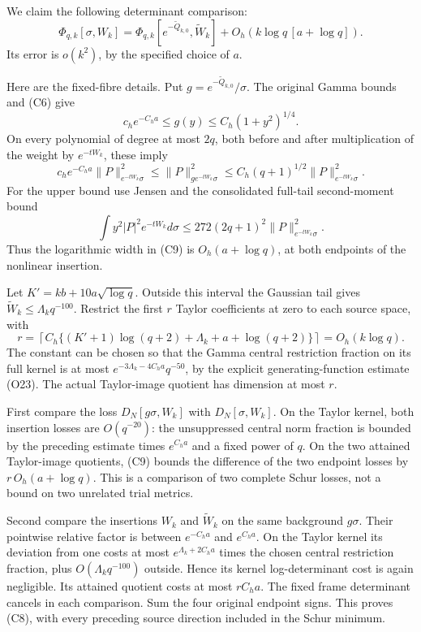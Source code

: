 \documentclass[
  11pt,
]{article}
\begin{document}
We claim the following determinant comparison: \[
\boxed{\Phi_{q,k}[\sigma,W_k]
=\Phi_{q,k}[e^{-\widetilde Q_{k,0}},\widetilde W_k]
+O_h\!\left(k\log q\,[a+\log q]\right).}\tag{C8}
\] Its error is \(o(k^2)\), by the specified choice of \(a\).

Here are the fixed-fibre details. Put
\(g=e^{-\widetilde Q_{k,0}}/\sigma\). The original Gamma bounds and (C6)
give \[
c_he^{-C_ha}\le g(y)\le C_h(1+y^2)^{1/4}.
\] On every polynomial of degree at most \(2q\), both before and after
multiplication of the weight by \(e^{-tW_k}\), these imply \[
c_he^{-C_ha}\|P\|_{e^{-tW_k}\sigma}^2
\le\|P\|_{g e^{-tW_k}\sigma}^2
\le C_h(q+1)^{1/2}\|P\|_{e^{-tW_k}\sigma}^2.
\tag{C9}
\] For the upper bound use Jensen and the consolidated full-tail
second-moment bound \[
\int y^2|P|^2e^{-tW_k}d\sigma\le272(2q+1)^2\|P\|_{e^{-tW_k}\sigma}^2.
\] Thus the logarithmic width in (C9) is \(O_h(a+\log q)\), at both
endpoints of the nonlinear insertion.

Let \(K'=kb+10a\sqrt{\log q}\). Outside this interval the Gaussian tail
gives \(\widetilde W_k\le\Lambda_k q^{-100}\). Restrict the first \(r\)
Taylor coefficients at zero to each source space, with \[
r=\left\lceil C_h\{(K'+1)\log(q+2)+\Lambda_k+a+\log(q+2)\}\right\rceil
=O_h(k\log q).
\tag{C10}
\] The constant can be chosen so that the Gamma central restriction
fraction on its full kernel is at most \(e^{-3\Lambda_k-4C_ha}q^{-50}\),
by the explicit generating-function estimate (O23). The actual
Taylor-image quotient has dimension at most \(r\).

First compare the loss \(D_N[g\sigma,W_k]\) with \(D_N[\sigma,W_k]\). On
the Taylor kernel, both insertion losses are \(O(q^{-20})\): the
unsuppressed central norm fraction is bounded by the preceding estimate
times \(e^{C_ha}\) and a fixed power of \(q\). On the two attained
Taylor-image quotients, (C9) bounds the difference of the two endpoint
losses by \(r\,O_h(a+\log q)\). This is a comparison of two complete
Schur losses, not a bound on two unrelated trial metrics.

Second compare the insertions \(W_k\) and \(\widetilde W_k\) on the same
background \(g\sigma\). Their pointwise relative factor is between
\(e^{-C_ha}\) and \(e^{C_ha}\). On the Taylor kernel its deviation from
one costs at most \(e^{\Lambda_k+2C_ha}\) times the chosen central
restriction fraction, plus \(O(\Lambda_kq^{-100})\) outside. Hence its
kernel log-determinant cost is again negligible. Its attained quotient
costs at most \(rC_ha\). The fixed frame determinant cancels in each
comparison. Sum the four original endpoint signs. This proves (C8), with
every preceding source direction included in the Schur minimum.
\end{document}

